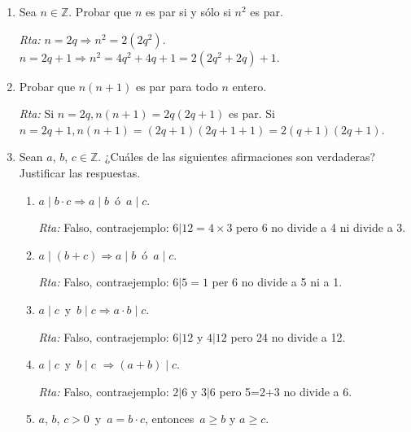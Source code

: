 \documentclass[12pt,spanish,makeidx]{amsbook}
\newcommand{\rta}{\noindent\textit{Rta: }}
\begin{document}
\begin{enumerate}
\begin{enumerate}
	\item  La suma de un número par y uno impar es impar.
	
	\rta $a=2q, b=2p+1 \Rightarrow a+b=2(q+p)+1$.
	
	\item $b + c$ es par si y  sólo si $b$ y $c$ son ambos pares o ambos impares.
	
	\rta $b=2q, c=2p \Rightarrow b+c=2(q+p); b=2q+1, c=2p+1\Rightarrow b+c=2q+1+2p+1=2(q+p+1)$.
\end{enumerate}

\smallskip

\item Sea $n\in \mathbb Z$. Probar que $n$ es par si y s\'olo si $n^2$ es par.

\rta $n=2q \Rightarrow n^2=2(2q^2)$. $n=2q+1\Rightarrow n^2=4q^2+4q+1=2(2q^2+2q)+1$.

\smallskip

\item Probar que $n(n+1)$ es par para todo $n$ entero.

\rta Si $ n=2q, n(n+1)=2q(2q+1)$ es par. Si $n=2q+1, n(n+1)=(2q+1)(2q+1+1)=2(q+1)(2q+1)$.

\smallskip

\item Sean $a$, $b$, $c \in {\mathbb Z}$. ¿Cuáles de las siguientes afirmaciones son verdaderas? Justificar las respuestas.
\begin{enumerate}
	\item $a \mid b\cdot c \Rightarrow a \mid b$\, \'o \,$a \mid c$.
	
	\rta Falso, contraejemplo: $6\vert12=4\times 3$ pero 6 no divide a 4 ni divide a 3.
	
	\item $a \mid (b+c) \Rightarrow a\mid b$\, \'o \,$a \mid c$.
	
	\rta Falso, contraejemplo: $6\vert 5=1$ per 6 no divide a 5 ni a 1.
	
	\item $a \mid c$\, y \,$b \mid c \Rightarrow a\cdot b \mid c$.
	
	\rta Falso, contraejemplo: $6\vert 12$ y $4\vert 12$ pero 24 no divide a 12.
	
	\item $a \mid c$\, y \,$b \mid c$ $\Rightarrow (a +b) \mid c$.
	
	\rta  Falso, contraejemplo: $2\vert 6$ y $3\vert 6$ pero 5=2+3 no divide a 6.
	
	\item $a$, $b$, $c>0$\, y \,$a=b\cdot c$, entonces  \,$a \ge b$ y $a \ge c$.
	

\end{enumerate}
\end{enumerate}
\end{document}
